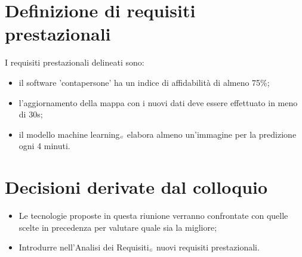 \section{Definizione di requisiti prestazionali}
I requisiti prestazionali delineati sono:
\begin{itemize}
	\item il software 'contapersone' ha un indice di affidabilità di almeno 75\%;
	\item l'aggiornamento della mappa con i nuovi dati deve essere effettuato in meno di 30s;
	\item il modello machine learning$_{\scaleto{G}{3pt}}$ elabora almeno un'immagine per la predizione ogni 4 minuti.
\end{itemize}
\section{Decisioni derivate dal colloquio}
\begin{itemize}
	\item Le tecnologie proposte in questa riunione verranno confrontate con quelle scelte in precedenza per valutare quale sia la migliore;
	\item Introdurre nell'Analisi dei Requisiti$_{\scaleto{G}{3pt}}$ nuovi requisiti prestazionali.
\end{itemize}